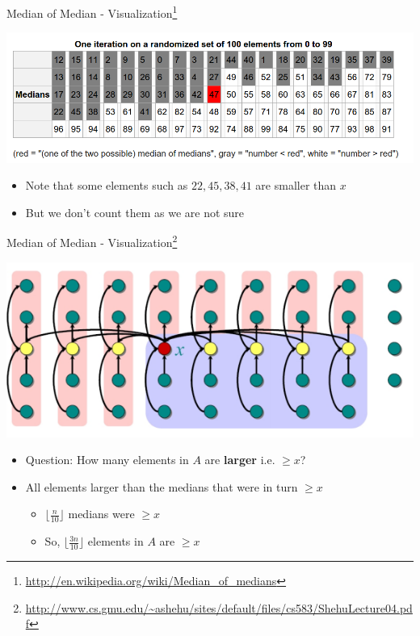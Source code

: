 \documentclass{beamer}
\begin{document}
\begin{frame}{Median of Median - Visualization\footnote{\url{http://en.wikipedia.org/wiki/Median_of_medians}}}
\begin{center}
    \includegraphics[scale=0.32]{medianOfMedianWiki.png}
\end{center}
\begin{itemize}
    \item Note that some elements such as $22, 45, 38, 41$ are smaller than $x$
    \item But we don't count them as we are not sure
\end{itemize}
\end{frame}




\begin{frame}{Median of Median - Visualization\footnote{\url{http://www.cs.gmu.edu/~ashehu/sites/default/files/cs583/ShehuLecture04.pdf}}}
\begin{center}
    \includegraphics[scale=0.4]{medianOfMedian7.png}
\end{center}
\begin{itemize}
    \item Question: How many elements in  $A$ are {\bf larger} i.e. $\geq x$? \pause
    \item All elements larger than the medians that were in turn $\geq x$ 
    \begin{itemize}
        \item $\lfloor \frac{n}{10} \rfloor$ medians were $\geq x$
        \item So, $\lfloor \frac{3n}{10} \rfloor$ elements in $A$ are $\geq x$
    \end{itemize}
\end{itemize}
\end{frame}
\end{document}
